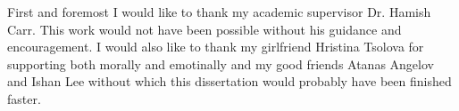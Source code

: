 First and foremost I would like to thank my academic supervisor Dr. Hamish Carr. This work would not have been possible without his guidance and encouragement. I would also like to thank my girlfriend Hristina Tsolova for supporting both morally and emotinally and my good friends Atanas Angelov and Ishan Lee without which this dissertation would probably have been finished faster.

%
%
%
